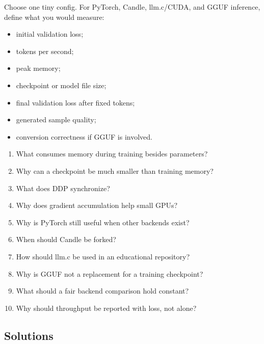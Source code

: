 
Choose one tiny config. For PyTorch, Candle, llm.c/CUDA, and GGUF inference, define what
you would measure:

\begin{itemize}
  \item initial validation loss;
  \item tokens per second;
  \item peak memory;
  \item checkpoint or model file size;
  \item final validation loss after fixed tokens;
  \item generated sample quality;
  \item conversion correctness if GGUF is involved.
\end{itemize}

\checkpoint

\begin{enumerate}
  \item What consumes memory during training besides parameters?
  \item Why can a checkpoint be much smaller than training memory?
  \item What does DDP synchronize?
  \item Why does gradient accumulation help small GPUs?
  \item Why is PyTorch still useful when other backends exist?
  \item When should Candle be forked?
  \item How should llm.c be used in an educational repository?
  \item Why is GGUF not a replacement for a training checkpoint?
  \item What should a fair backend comparison hold constant?
  \item Why should throughput be reported with loss, not alone?
\end{enumerate}

\subsection*{Solutions}

